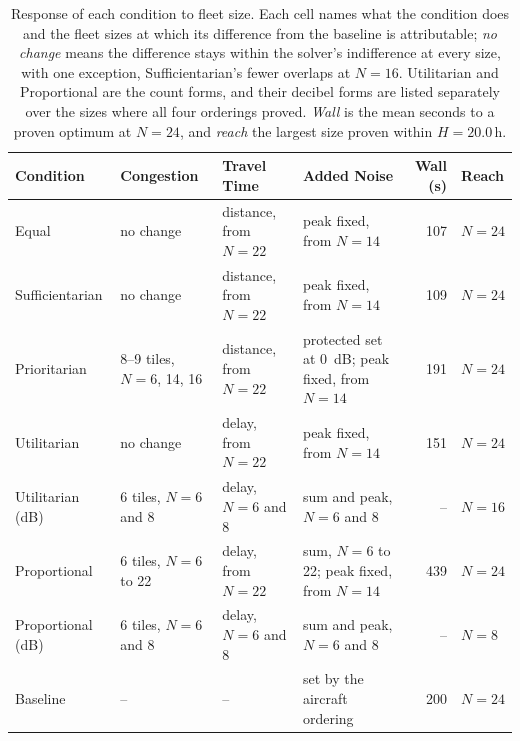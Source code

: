 \begin{table}[t]
\centering
\footnotesize
\caption{Response of each condition to fleet size. Each cell names what the condition
does and the fleet sizes at which its difference from the baseline is attributable;
\emph{no change} means the difference stays within the solver's indifference at every
size, with one exception, Sufficientarian's fewer overlaps at $N=16$. Utilitarian and
Proportional are the count forms, and their decibel forms are listed separately over the
sizes where all four orderings proved. \emph{Wall} is the mean seconds to a proven
optimum at $N=24$, and \emph{reach} the largest size proven within $H=20.0$\,h.}
\label{tab:response}
\begin{tabular}{@{}llllrl@{}}
\toprule
Condition & Congestion & Travel Time & Added Noise & Wall (s) & Reach \\
\midrule
Equal & no change & distance, from $N=22$ & peak fixed, from $N=14$ & 107 & $N=24$ \\
Sufficientarian & no change & distance, from $N=22$ & peak fixed, from $N=14$ & 109 & $N=24$ \\
Prioritarian & 8--9 tiles, $N=6$, 14, 16 & distance, from $N=22$ & protected set at \SI{0}{\dB}; peak fixed, from $N=14$ & 191 & $N=24$ \\
Utilitarian & no change & delay, from $N=22$ & peak fixed, from $N=14$ & 151 & $N=24$ \\
Utilitarian (dB) & 6 tiles, $N=6$ and 8 & delay, $N=6$ and 8 & sum and peak, $N=6$ and 8 & -- & $N=16$ \\
Proportional & 6 tiles, $N=6$ to 22 & delay, from $N=22$ & sum, $N=6$ to 22; peak fixed, from $N=14$ & 439 & $N=24$ \\
Proportional (dB) & 6 tiles, $N=6$ and 8 & delay, $N=6$ and 8 & sum and peak, $N=6$ and 8 & -- & $N=8$ \\
Baseline & -- & -- & set by the aircraft ordering & 200 & $N=24$ \\
\bottomrule
\end{tabular}
\end{table}


